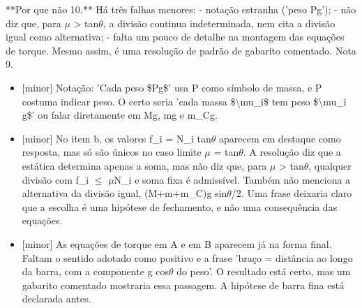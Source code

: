 \documentclass{article}%
\begin{document}
\newline%
**Por que não 10.** Há três falhas menores:\newline%
{-} notação estranha ('peso Pg');\newline%
{-} não diz que, para $\mu$ > tan$\theta$, a divisão continua indeterminada, nem cita a divisão igual como alternativa;\newline%
{-} falta um pouco de detalhe na montagem das equações de torque.\newline%
\newline%
Mesmo assim, é uma resolução de padrão de gabarito comentado. Nota 9.%
\begin{itemize}%
\item%
{[}minor{]} Notação: 'Cada peso \$Pg\$' usa P como símbolo de massa, e P costuma indicar peso. O certo seria 'cada massa \$\textbackslash{}mu\_i\$ tem peso \$\textbackslash{}mu\_i g\$' ou falar diretamente em Mg, mg e m\_Cg.%
\item%
{[}minor{]} No item b, os valores f\_i = N\_i tan$\theta$ aparecem em destaque como resposta, mas só são únicos no caso limite $\mu$ = tan$\theta$. A resolução diz que a estática determina apenas a soma, mas não diz que, para $\mu$ > tan$\theta$, qualquer divisão com f\_i $\leq$ $\mu$N\_i e soma fixa é admissível. Também não menciona a alternativa da divisão igual, (M+m+m\_C)g sin$\theta$/2. Uma frase deixaria claro que a escolha é uma hipótese de fechamento, e não uma consequência das equações.%
\item%
{[}minor{]} As equações de torque em A e em B aparecem já na forma final. Faltam o sentido adotado como positivo e a frase 'braço = distância ao longo da barra, com a componente g cos$\theta$ do peso'. O resultado está certo, mas um gabarito comentado mostraria essa passagem. A hipótese de barra fina está declarada antes.%
\end{itemize}%
\end{document}
